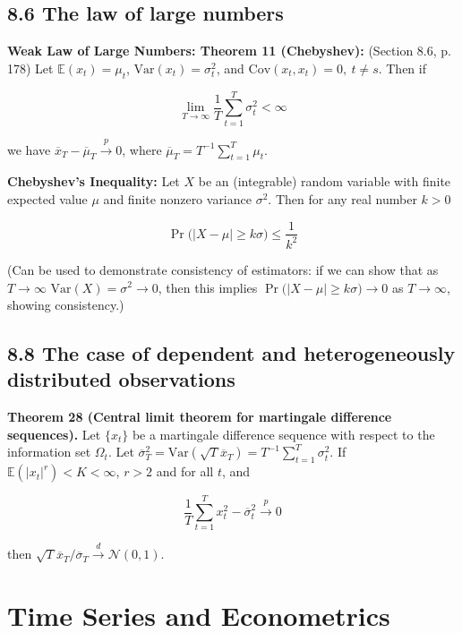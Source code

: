 \documentclass{article}
\newcommand{\E}{\mathbb{E}}
\newcommand{\Var}{\mathrm{Var}}
\newcommand{\Cov}{\mathrm{Cov}}
\begin{document}
\subsection{8.6 The law of large numbers}
\label{sec:tsch8.6}

\textbf{Weak Law of Large Numbers: Theorem 11 (Chebyshev):} (Section 8.6, p. 178) Let \(\E(x_t) = \mu_t\), \(\Var(x_t) = \sigma_t^2\), and \(\Cov(x_t, x_t) = 0, \ t \neq s\). Then if 

\[
\lim_{T \to \infty} \frac{1}{T} \sum_{t=1}^T \sigma_t^2 < \infty
\]

we have \(\overline{x}_T - \overline{\mu}_T \xrightarrow{p} 0\), where \( \overline{\mu}_T = T^{-1} \sum_{t=1}^T \mu_t\).

\textbf{Chebyshev's Inequality:} Let \(X\) be an (integrable) random variable with finite expected value \(\mu\) and finite nonzero variance \(\sigma^2\). Then for any real number \(k > 0\)

\[
\Pr \big(\left| X - \mu \right| \geq k \sigma \big) \leq \frac{1}{k^2}
\] 

(Can be used to demonstrate consistency of estimators: if we can show that as \(T \to \infty\) \(\Var(X) = \sigma^2 \to 0\), then this implies \(\Pr \big(\left| X - \mu \right| \geq k \sigma \big) \to 0\) as \(T \to \infty\), showing consistency.)

\subsection{8.8 The case of dependent and heterogeneously distributed observations}
\label{sec:tsch8.8}

\textbf{Theorem 28 (Central limit theorem for martingale difference sequences).} Let \(\{x_t\}\) be a martingale difference sequence with respect to the information set \(\Omega_t\). Let \(\overline{\sigma}_T^2 = \Var( \sqrt{T} \overline{x}_T) = T^{-1} \sum_{t=1}^T \sigma_t^2\). If \(\E(|x_t|^r) < K < \infty\), \(r > 2\) and for all \(t\), and

\[
\frac{1}{T} \sum_{t=1}^T x_t^2 - \overline{\sigma}_t^2 \xrightarrow{p} 0
\]

then \(\sqrt{T} \overline{x}_T / \overline{\sigma}_T \xrightarrow{d} \mathcal{N}(0, 1)\).

\pagebreak

\section{Time Series and Econometrics}
\end{document}

